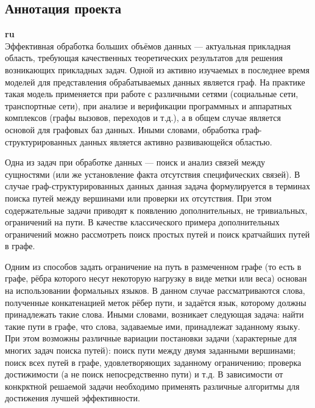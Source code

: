 \documentclass[12pt]{article}  %
\theoremstyle{remark}
\begin{document}
\subsection{Аннотация проекта}
\textbf{ru}\\
%
Эффективная обработка больших объёмов данных --- актуальная прикладная область, требующая качественных теоретических результатов для решения возникающих прикладных задач.
Одной из активно изучаемых в последнее время моделей для представления обрабатываемых данных является граф.
На практике такая модель применяется при работе с различными сетями (социальные сети, транспортные сети), при анализе и верификации программных и аппаратных комплексов (графы вызовов, переходов и т.д.), а в общем случае является основой для графовых баз данных.
Иными словами, обработка граф-структурированных данных является активно развивающейся областью.

Одна из задач при обработке данных --- поиск и анализ связей между сущностями (или же установление факта отсутствия специфических связей).
В случае граф-структурированных данных данная задача формулируется в терминах поиска путей между вершинами или проверки их отсутствия.
При этом содержательные задачи приводят к появлению дополнительных, не тривиальных, ограничений на пути.
В качестве классического примера дополнительных ограничений можно рассмотреть поиск простых путей и поиск кратчайших путей в графе.

Одним из способов задать ограничение на путь в размеченном графе (то есть в графе, рёбра которого несут некоторую нагрузку в виде метки или веса) основан на использовании формальных языков.
В данном случае рассматриваются слова, полученные конкатенацией меток рёбер пути, и задаётся язык, которому должны принадлежать такие слова.
Иными словами, возникает следующая задача: найти такие пути в графе, что слова, задаваемые ими, принадлежат заданному языку.
При этом возможны различные вариации постановки задачи (характерные для многих задач поиска путей): поиск пути между двумя заданными вершинами; поиск всех путей в графе, удовлетворяющих заданному ограничению; проверка достижимости (а не поиск непосредственно пути) и т.д.
В зависимости от конкрктной решаемой задачи необходимо применять различные алгоритмы для достижения лучшей эффективности.
\end{document}
